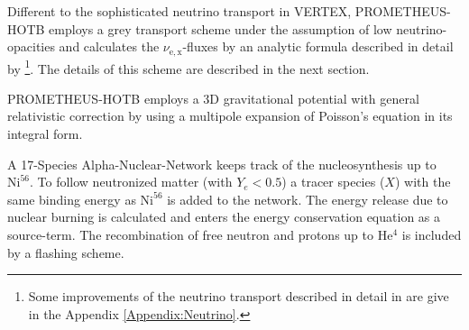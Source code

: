\documentclass[fleqn,usenatbib]{mnras}
\newcommand{\helium}{$\mathrm{He^{4}}$\xspace}
\newcommand{\prom}{\textsc{P{\footnotesize ROMETHEUS}-H{\footnotesize OT}B}\xspace}
\newcommand{\vertex}{\textsc{V{\footnotesize ERTEX}}\xspace}
\begin{document}
Different to the sophisticated neutrino transport in \vertex, \prom employs a grey transport scheme under the assumption of low neutrino-opacities and calculates the $\nu_{\mathrm{e,x}}$-fluxes by an analytic formula described in detail by \cite{Scheck2006}\footnote{Some improvements of the neutrino transport described in detail in \cite{Scheck2006} are give in the Appendix \ref{Appendix:Neutrino}.}. The details of this scheme are described in the next section.

\prom employs a 3D gravitational potential with general relativistic correction by using a multipole expansion of Poisson's equation in its integral form. 

A 17-Species Alpha-Nuclear-Network keeps track of the nucleosynthesis up to $\mathrm{Ni}^{56}$. To follow neutronized matter (with $Y_e < 0.5 $) a tracer species ($X$) with the same binding energy as $\mathrm{Ni}^{56}$ is added to the network. The energy release due to nuclear burning is calculated and enters the energy conservation equation as a source-term. 
The recombination of free neutron and protons up to \helium is included by a flashing scheme.
\end{document}
